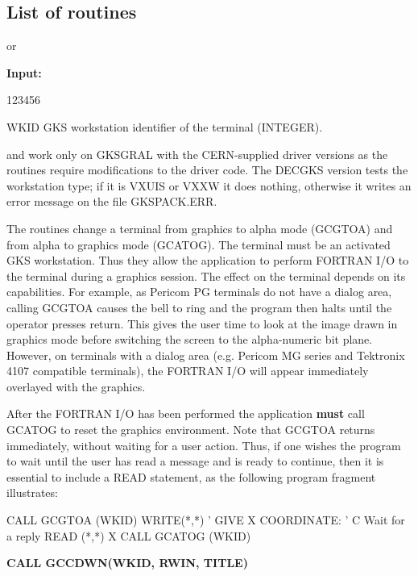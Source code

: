 \subsection{List of routines}
\begin{OL}
\item {} or 
 
{\bf Input:}
\begin{DLtt}{123456}
\item[WKID]GKS workstation identifier of the terminal (INTEGER).
\end{DLtt}
 
 and  work only on GKSGRAL with the CERN-supplied
driver versions as the routines require modifications to the driver code.
The DECGKS version tests the workstation type; if it is VXUIS or VXXW
it does nothing, otherwise it writes an error message on the file
GKSPACK.ERR.
 
The routines change a terminal from graphics to alpha mode (GCGTOA)
and from alpha to graphics mode (GCATOG). The terminal must be an
activated GKS workstation.
Thus they allow the application to perform FORTRAN I/O to
the terminal during a graphics session. The effect on the terminal
depends on its capabilities. For example, as Pericom PG terminals
do not have a dialog area, calling GCGTOA causes the bell to ring
and the program then halts until the operator presses return.
This gives the user time to look at the image drawn in graphics
mode before switching the screen to the alpha-numeric bit plane.
However, on terminals with a dialog area (e.g. Pericom
MG series and Tektronix 4107 compatible terminals),
the FORTRAN I/O will appear immediately overlayed with the graphics.
 
After the FORTRAN I/O has been performed the application
{\bf must} call GCATOG to reset the graphics environment.
Note that GCGTOA returns immediately, without waiting for a user
action. Thus, if one wishes the program to wait until the user has read
a message and is ready to continue, then it is essential to include
a READ statement, as the following program fragment illustrates:
\begin{XMP}
      CALL GCGTOA (WKID)
      WRITE(*,*) ' GIVE X COORDINATE: '
C  Wait for a reply
      READ (*,*) X
      CALL GCATOG (WKID)
\end{XMP}
\item {\bf CALL GCCDWN(WKID, RWIN, TITLE)}
 

\end{OL}
